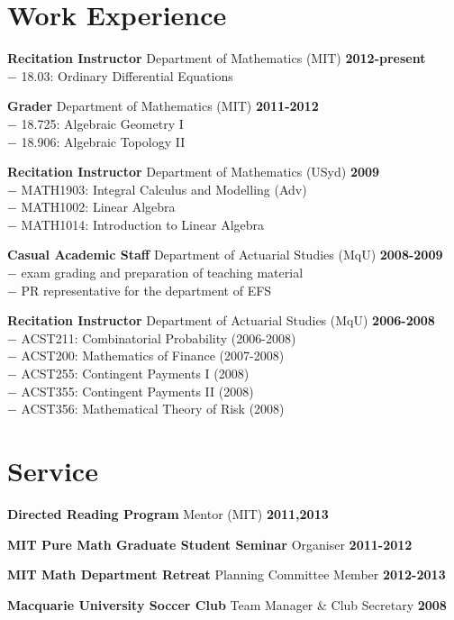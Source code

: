 \documentclass[margin,line]{resume}
\newcommand{\award}[3]{\textbf{#1} #2 \hfill \textbf{#3}
           
\vspace{-2.3mm}}
\newcommand{\twolineaward}[4]{\textbf{#1} #2 \hfill \textbf{#4}\\%
#3
           
\vspace{-2.3mm}}
\begin{document}
\begin{resume}
         \section{\mysidestyle Work Experience}
\twolineaward{Recitation Instructor}{Department of Mathematics (MIT)}{\phantom{space}$-$ 18.03: Ordinary Differential Equations}{2012-present}
\twolineaward{Grader}{Department of Mathematics (MIT)}{%
\phantom{space}$-$ 18.725: Algebraic Geometry I\\
\phantom{space}$-$ 18.906: Algebraic Topology II%
}{2011-2012}
\twolineaward{Recitation Instructor}{Department of Mathematics (USyd)}{%
\phantom{space}$-$ MATH1903: Integral Calculus and Modelling (Adv)\\
\phantom{space}$-$ MATH1002: Linear Algebra\\
\phantom{space}$-$ MATH1014: Introduction to Linear Algebra%
}{2009}
\twolineaward{Casual Academic Staff}{Department of Actuarial Studies (MqU)}{%
\phantom{space}$-$ exam grading and preparation of teaching material\\
\phantom{space}$-$ PR representative for the department of EFS%
}{2008-2009}
\twolineaward{Recitation Instructor}{Department of Actuarial Studies (MqU)}{%
\phantom{space}$-$ ACST211: Combinatorial Probability (2006-2008)\\
\phantom{space}$-$ ACST200: Mathematics of Finance (2007-2008)\\
\phantom{space}$-$ ACST255: Contingent Payments I (2008)\\
\phantom{space}$-$ ACST355: Contingent Payments II (2008)\\
\phantom{space}$-$ ACST356: Mathematical Theory of Risk (2008)%
}{2006-2008}


\vspace{2mm}


   \section{\mysidestyle Service}
\award{Directed Reading Program}{Mentor (MIT)}{2011,2013}
\award{MIT Pure Math Graduate Student Seminar}{Organiser}{2011-2012}
\award{MIT Math Department Retreat}{Planning Committee Member}{2012-2013}
\award{Macquarie University Soccer Club}{Team Manager \& Club Secretary}{2008}



\end{resume}
\end{document}
